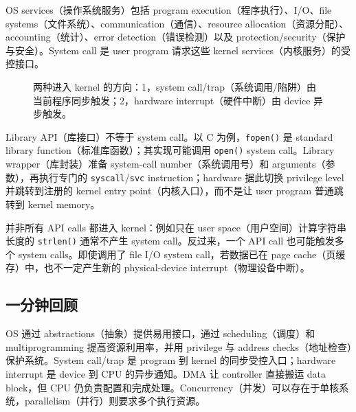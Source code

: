 OS services（操作系统服务）包括 program execution（程序执行）、I/O、file systems（文件系统）、communication（通信）、resource allocation（资源分配）、accounting（统计）、error detection（错误检测）以及 protection/security（保护与安全）。System call 是 user program 请求这些 kernel services（内核服务）的受控接口。

\begin{figure}[htbp]
  \centering
  \resizebox{0.88\textwidth}{!}{}
  \caption{两种进入 kernel 的方向：1，system call/trap（系统调用/陷阱）由当前程序同步触发；2，hardware interrupt（硬件中断）由 device 异步触发。}
  \label{fig:sc2005-l02-privilege-boundary}
\end{figure}

Library API（库接口）不等于 system call。以 C 为例，\texttt{fopen()} 是 standard library function（标准库函数）；其实现可能调用 \texttt{open()} system call。Library wrapper（库封装）准备 system-call number（系统调用号）和 arguments（参数），再执行专门的 \texttt{syscall}/\texttt{svc} instruction；hardware 据此切换 privilege level 并跳转到注册的 kernel entry point（内核入口），而不是让 user program 普通跳转到 kernel memory。

并非所有 API calls 都进入 kernel：例如只在 user space（用户空间）计算字符串长度的 \texttt{strlen()} 通常不产生 system call。反过来，一个 API call 也可能触发多个 system calls。即使调用了 file I/O system call，若数据已在 page cache（页缓存）中，也不一定产生新的 physical-device interrupt（物理设备中断）。

\subsection{一分钟回顾}
\par\noindent
OS 通过 abstractions（抽象）提供易用接口，通过 scheduling（调度）和 multiprogramming 提高资源利用率，并用 privilege 与 address checks（地址检查）保护系统。System call/trap 是 program 到 kernel 的同步受控入口；hardware interrupt 是 device 到 CPU 的异步通知。DMA 让 controller 直接搬运 data block，但 CPU 仍负责配置和完成处理。Concurrency（并发）可以存在于单核系统，parallelism（并行）则要求多个执行资源。
